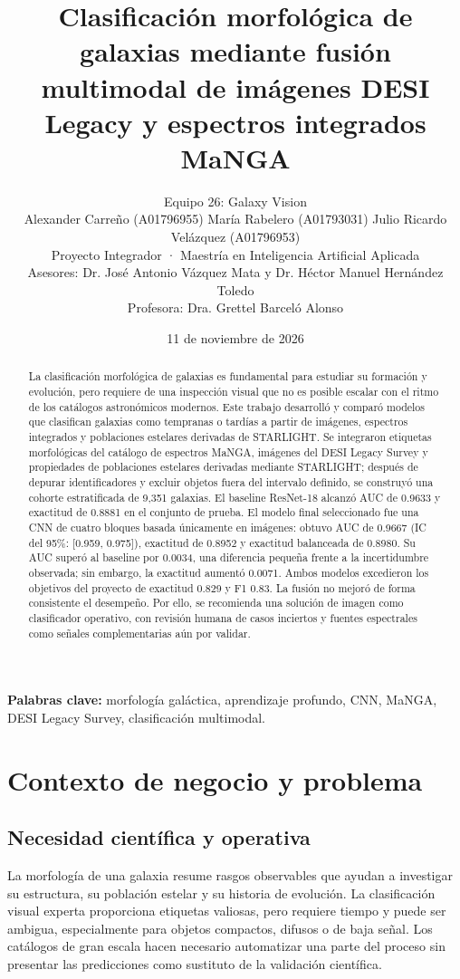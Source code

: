 \documentclass[letterpaper,11pt]{article}
\title{\textbf{Clasificación morfológica de galaxias mediante fusión multimodal de imágenes DESI Legacy y espectros integrados MaNGA}}
\author{
Equipo 26: Galaxy Vision\\
Alexander Carreño (A01796955) \quad
María Rabelero (A01793031) \quad
Julio Ricardo Velázquez (A01796953)\\[0.5em]
Proyecto Integrador · Maestría en Inteligencia Artificial Aplicada\\
Asesores: Dr. José Antonio Vázquez Mata y Dr. Héctor Manuel Hernández Toledo\\
Profesora: Dra. Grettel Barceló Alonso
}
\date{11 de noviembre de 2026}
\begin{document}
\maketitle

\begin{abstract}
La clasificación morfológica de galaxias es fundamental para estudiar su formación y evolución, pero requiere de una inspección visual que no es posible escalar con el ritmo de los catálogos astronómicos modernos. Este trabajo desarrolló y comparó modelos que clasifican galaxias como tempranas o tardías a partir de imágenes, espectros integrados y poblaciones estelares derivadas de STARLIGHT. Se integraron etiquetas morfológicas del catálogo de espectros MaNGA, imágenes del DESI Legacy Survey y propiedades de poblaciones estelares derivadas mediante STARLIGHT; después de depurar identificadores y excluir objetos fuera del intervalo definido, se construyó una cohorte estratificada de 9,351 galaxias. El baseline ResNet-18 alcanzó AUC de 0.9633 y exactitud de 0.8881 en el conjunto de prueba. El modelo final seleccionado fue una CNN de cuatro bloques basada únicamente en imágenes: obtuvo AUC de 0.9667 (IC del 95\%: [0.959, 0.975]), exactitud de 0.8952 y exactitud balanceada de 0.8980. Su AUC superó al baseline por 0.0034, una diferencia pequeña frente a la incertidumbre observada; sin embargo, la exactitud aumentó 0.0071. Ambos modelos excedieron los objetivos del proyecto de exactitud 0.829 y F1 0.83. La fusión no mejoró de forma consistente el desempeño. Por ello, se recomienda una solución de imagen como clasificador operativo, con revisión humana de casos inciertos y fuentes espectrales como señales complementarias aún por validar.
\end{abstract}

\noindent\textbf{Palabras clave:} morfología galáctica, aprendizaje profundo, CNN, MaNGA, DESI Legacy Survey, clasificación multimodal.

\section{Contexto de negocio y problema}

\subsection{Necesidad científica y operativa}

La morfología de una galaxia resume rasgos observables que ayudan a investigar su estructura, su población estelar y su historia de evolución. La clasificación visual experta proporciona etiquetas valiosas, pero requiere tiempo y puede ser ambigua, especialmente para objetos compactos, difusos o de baja señal. Los catálogos de gran escala hacen necesario automatizar una parte del proceso sin presentar las predicciones como sustituto de la validación científica.
\end{document}
